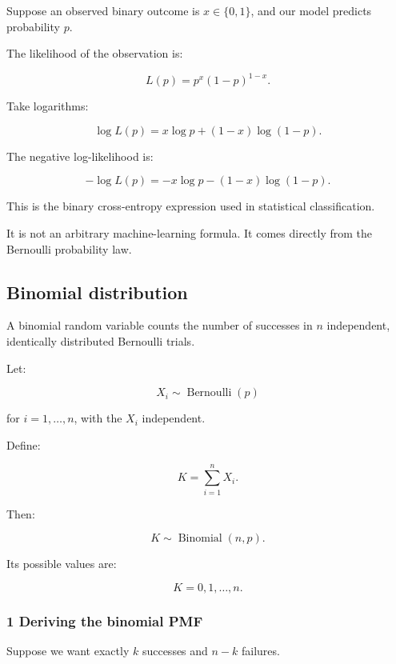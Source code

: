 \hypertarget{02-foundations-ii-ch023-bernoulli-likelihood-and-cross-entropy}{}

Suppose an observed binary outcome is \(x\in\{0,1\}\), and our model predicts probability \(p\).

The likelihood of the observation is:

\[
 L(p)=p^x(1-p)^{1-x}.
\]

Take logarithms:

\[
 \log L(p)= x\log p+(1-x)\log(1-p).
\]

The negative log-likelihood is:

\[
 \boxed{ -\log L(p)= -x\log p-(1-x)\log(1-p) }.
\]

This is the binary cross-entropy expression used in statistical classification.

It is not an arbitrary machine-learning formula. It comes directly from the Bernoulli probability law.

\subsection{Binomial distribution}\label{02-foundations-ii-ch023-binomial-distribution}

\hypertarget{02-foundations-ii-ch023-binomial-distribution}{}

A binomial random variable counts the number of successes in \(n\) independent, identically distributed Bernoulli trials.

Let:

\[
 X_i\sim\operatorname{Bernoulli}(p)
\]

for \(i=1,\ldots,n\), with the \(X_i\) independent.

Define:

\[
 K=\sum_{i=1}^nX_i.
\]

Then:

\[
 \boxed{K\sim\operatorname{Binomial}(n,p)}.
\]

Its possible values are:

\[
 K=0,1,\ldots,n.
\]

\subsubsection{1 Deriving the binomial PMF}\label{02-foundations-ii-ch023-deriving-the-binomial-pmf}

\hypertarget{02-foundations-ii-ch023-deriving-the-binomial-pmf}{}

Suppose we want exactly \(k\) successes and \(n-k\) failures.

